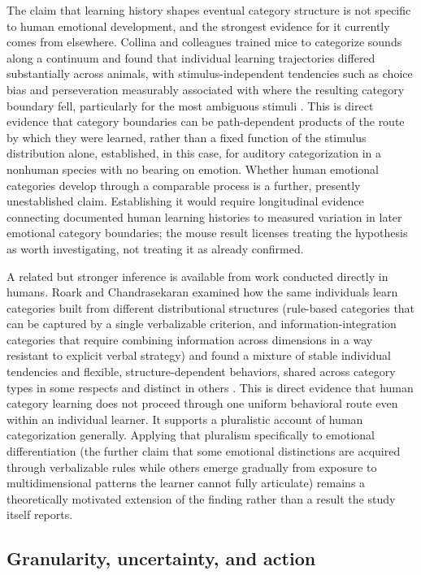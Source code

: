 \documentclass[11pt]{article}
\begin{document}
The claim that learning history shapes eventual category structure is not specific to human emotional development, and the strongest evidence for it currently comes from elsewhere. Collina and colleagues trained mice to categorize sounds along a continuum and found that individual learning trajectories differed substantially across animals, with stimulus-independent tendencies such as choice bias and perseveration measurably associated with where the resulting category boundary fell, particularly for the most ambiguous stimuli \citep{Collina2025}. This is direct evidence that category boundaries can be path-dependent products of the route by which they were learned, rather than a fixed function of the stimulus distribution alone, established, in this case, for auditory categorization in a nonhuman species with no bearing on emotion. Whether human emotional categories develop through a comparable process is a further, presently unestablished claim. Establishing it would require longitudinal evidence connecting documented human learning histories to measured variation in later emotional category boundaries; the mouse result licenses treating the hypothesis as worth investigating, not treating it as already confirmed.

A related but stronger inference is available from work conducted directly in humans. Roark and Chandrasekaran examined how the same individuals learn categories built from different distributional structures (rule-based categories that can be captured by a single verbalizable criterion, and information-integration categories that require combining information across dimensions in a way resistant to explicit verbal strategy) and found a mixture of stable individual tendencies and flexible, structure-dependent behaviors, shared across category types in some respects and distinct in others \citep{Roark2023}. This is direct evidence that human category learning does not proceed through one uniform behavioral route even within an individual learner. It supports a pluralistic account of human categorization generally. Applying that pluralism specifically to emotional differentiation (the further claim that some emotional distinctions are acquired through verbalizable rules while others emerge gradually from exposure to multidimensional patterns the learner cannot fully articulate) remains a theoretically motivated extension of the finding rather than a result the study itself reports.

\subsection{Granularity, uncertainty, and action}
\end{document}
